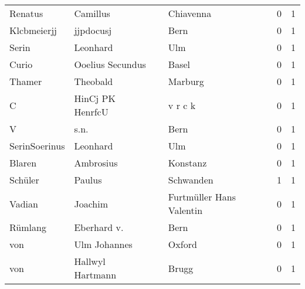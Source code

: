 \begin{tabular}{llllrr}
                  Renatus &                           Camillus &             &                                   Chiavenna &          0 &         1 \\
              Klcbmeierjj &                          jjpdocusj &             &                                        Bern &          0 &         1 \\
                    Serin &                           Leonhard &             &                                         Ulm &          0 &         1 \\
                    Curio &                   Ooelius Secundus &             &                                       Basel &          0 &         1 \\
                   Thamer &                           Theobald &             &                                     Marburg &          0 &         1 \\
                        C &                   HinCj PK HenrfcU &             &                                     v r c k &          0 &         1 \\
                        V &                               s.n. &             &                                        Bern &          0 &         1 \\
            SerinSoerinus &                           Leonhard &             &                                         Ulm &          0 &         1 \\
                   Blaren &                          Ambrosius &             &                                    Konstanz &          0 &         1 \\
                  Schüler &                             Paulus &             &                                   Schwanden &          1 &         1 \\
                   Vadian &                            Joachim &             &                    Furtmüller Hans Valentin &          0 &         1 \\
                  Rümlang &                        Eberhard v. &             &                                        Bern &          0 &         1 \\
                      von &                       Ulm Johannes &             &                                      Oxford &          0 &         1 \\
                      von &                   Hallwyl Hartmann &             &                                       Brugg &          0 &         1 \\

\end{tabular}
